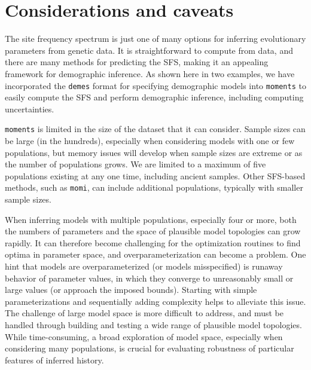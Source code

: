 \documentclass[]{article}
\newcommand{\moments}{\texttt{moments}\xspace}
\newcommand{\demes}{\texttt{demes}\xspace}
\newcommand{\momi}{\texttt{momi}\xspace}
\begin{document}
\section*{Considerations and caveats}\label{sec:conclusions}

The site frequency spectrum is just one of many options for inferring
evolutionary parameters from genetic data. It is straightforward to compute
from data, and there are many methods for predicting the SFS, making it an
appealing framework for demographic inference. As shown here in two examples,
we have incorporated the \demes format for specifying demographic models into
\moments to easily compute the SFS and perform demographic inference, including
computing uncertainties.

\moments is limited in the size of the dataset that it can consider. Sample
sizes can be large (in the hundreds), especially when considering models with
one or few populations, but memory issues will develop when sample sizes are
extreme or as the number of populations grows. We are limited to a maximum of
five populations existing at any one time, including ancient samples. Other
SFS-based methods, such as \momi \cite{kamm2020efficiently, dilber2024faster},
can include additional populations, typically with smaller sample sizes.

When inferring models with multiple populations, especially four or more, both
the numbers of parameters and the space of plausible model topologies can grow
rapidly. It can therefore become challenging for the optimization routines to
find optima in parameter space, and overparameterization can become a problem.
One hint that models are overparameterized (or models misspecified) is runaway
behavior of parameter values, in which they converge to unreasonably small or
large values (or approach the imposed bounds). Starting with simple
parameterizations and sequentially adding complexity helps to alleviate this
issue. The challenge of large model space is more difficult to address, and
must be handled through building and testing a wide range of plausible model
topologies. While time-consuming, a broad exploration of model space,
especially when considering many populations, is crucial for evaluating
robustness of particular features of inferred history.
\end{document}
